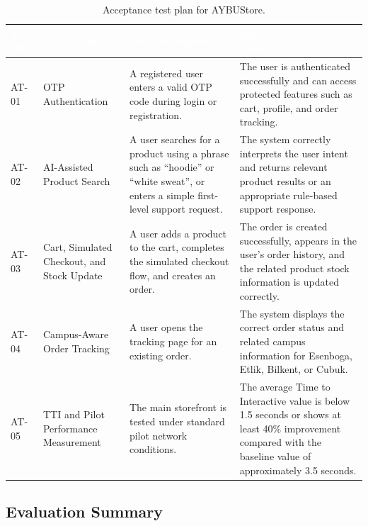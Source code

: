 \documentclass[11pt,a4paper]{article}
\begin{document}
\renewcommand{\arraystretch}{1.25}
\begin{table}[H]
\centering
\small
\begin{tabularx}{\textwidth}{|p{}|p{}|X|X|}
\hline
\rowcolor{aybuHeader}
\textcolor{white}{\textbf{Test ID}} &
\textcolor{white}{\textbf{Test Scenario}} &
\textcolor{white}{\textbf{Test Description}} &
\textcolor{white}{\textbf{Expected Success Criteria}} \\
\hline
 
AT-01 &
OTP Authentication &
A registered user enters a valid OTP code during login or registration. &
The user is authenticated successfully and can access protected
features such as cart, profile, and order tracking. \\
\hline
 
AT-02 &
AI-Assisted Product Search &
A user searches for a product using a phrase such as ``hoodie'' or
``white sweat'', or enters a simple first-level support request. &
The system correctly interprets the user intent and returns relevant
product results or an appropriate rule-based support response. \\
\hline
 
AT-03 &
Cart, Simulated Checkout, and Stock Update &
A user adds a product to the cart, completes the simulated checkout
flow, and creates an order. &
The order is created successfully, appears in the user's order history,
and the related product stock information is updated correctly. \\
\hline
 
AT-04 &
Campus-Aware Order Tracking &
A user opens the tracking page for an existing order. &
The system displays the correct order status and related campus
information for Esenboga, Etlik, Bilkent, or Cubuk. \\
\hline
 
AT-05 &
TTI and Pilot Performance Measurement &
The main storefront is tested under standard pilot network conditions. &
The average Time to Interactive value is below 1.5 seconds or shows at
least 40\% improvement compared with the baseline value of
approximately 3.5 seconds. \\
\hline
 
\end{tabularx}
\caption{Acceptance test plan for AYBUStore.}
\label{tab:acceptance-tests-39}
\end{table}
 
\subsection{Evaluation Summary}
 
\end{document}
